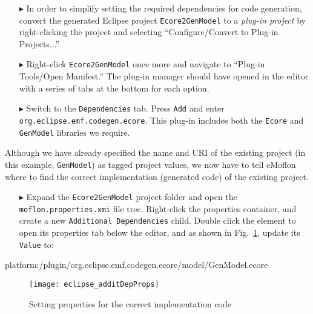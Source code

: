 \begin{enumerate}
\item[$\blacktriangleright$] In order to simplify setting the required dependencies for code generation,  convert the generated Eclipse project
\texttt{Ecore2GenModel} to a \emph{plug-in project} by right-clicking the project and selecting ``Configure/Convert to Plug-in Projects...''

\item[$\blacktriangleright$] Right-click \texttt{Ecore2GenModel} once more and navigate to ``Plug-in Tools/Open Manifest.'' The plug-in manager should have
opened in the editor with a series of tabs at the bottom for each option.

\item[$\blacktriangleright$] Switch to the \texttt{Dependencies} tab. Press \texttt{Add} and enter \texttt{org.\-eclipse.\-emf.\-codegen.\-ecore}. This plug-in
includes both the \texttt{Ecore} and \texttt{Gen\-Mod\-el} libraries we require.

\end{enumerate}

Although we have already specified the name and URI of the existing project (in this example, \texttt{GenModel}) as tagged project values, we now have to tell
eMoflon where to find the correct implementation (generated code) of the existing project.

\begin{enumerate}
  
\item[$\blacktriangleright$] Expand the \texttt{Ecore2GenModel} project folder and open the \texttt{mof\-lon.\-prop\-er\-ties.\-xmi} file tree. Right-click the
properties container, and create a new \texttt{Add\-it\-ion\-al Dep\-en\-den\-cies} child. Double click the element to open its properties tab below the
editor, and as shown in Fig.~\ref{eclipse:addDepChild}, update its \texttt{Value} to:\\
\end{enumerate}

\vspace{-1cm}
{\small \ttfamily  platform:/plugin/org.eclipse.emf.codegen.ecore/model/GenModel.ecore} \\
\vspace{-0.5cm}

\begin{figure}[htbp]
\begin{centering}
\texttt{[image: eclipse\_additDepProps]}
  \caption{Setting properties for the correct implementation code}  
  \label{eclipse:addDepChild}
\end{centering}
\end{figure} 

